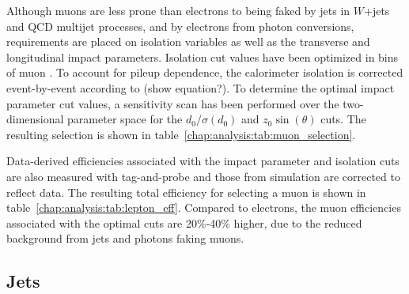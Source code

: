 Although muons are less prone than electrons to being faked by jets in $W$+jets and
QCD multijet processes, and by electrons from photon conversions,
requirements are placed on isolation variables as well as
the transverse and longitudinal impact parameters. Isolation cut
values have been optimized in bins of muon \pt. To account for pileup
dependence, the calorimeter isolation is corrected event-by-event
according to \nvtx (show equation?). To determine the
optimal impact parameter cut values, a sensitivity scan has been
performed over the two-dimensional parameter space for the
$d_0/\sigma{(d_0)}$ and $z_0\sin(\theta)$ cuts. The resulting
selection is shown in table~\ref{chap:analysis:tab:muon_selection}.

\begin{table}[h]
\centering
\renewcommand{\arraystretch}{1.1}
\caption[Muon selection summary in \pt~bins.]{Muon selection summary in
  \pt~bins, including the identification category, the calorimeter and
track isolation cuts, and the impact parameter cuts.}
\label{chap:analysis:tab:muon_selection}
\end{table}

Data-derived efficiencies associated with the impact parameter and isolation cuts
are also measured with tag-and-probe and those from simulation are
corrected to reflect data. The resulting total efficiency for
selecting a muon is shown in
table~\ref{chap:analysis:tab:lepton_eff}. Compared to electrons, the
muon efficiencies associated with the optimal cuts are 20\%-40\%
higher, due to the reduced background from jets and photons faking
muons.

\subsection{Jets}

